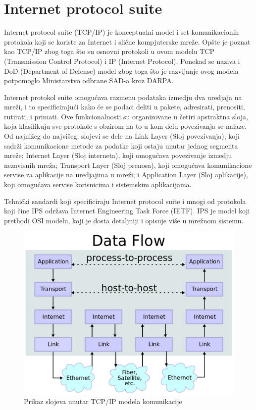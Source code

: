 \documentclass[a4paper,12pt, master]{etf}
\begin{document}
	\section{Internet protocol suite}

	Internet protocol suite (TCP/IP) je konceptualni model i set komunikacionih
	protokola koji se koriste za Internet i sli\v{c}ne kompjuterske mre\v{z}e.
	Op\v{s}te je poznat kao TCP/IP zbog toga \v{s}to su osnovni protokoli u
	ovom modelu TCP (Transmission Control Protocol) i IP (Internet Protocol).
	Ponekad se naziva i DoD (Department of Defense) model zbog toga \v{s}to je
	razvijanje ovog modela potpomoglo Ministarstvo odbrane SAD-a kroz DARPA.

	Internet protokol suite omogu\'{c}ava razmenu podataka izmedju dva uredjaja
    na mre\v{z}i, i to specificiraju\'{c}i kako \'{c}e se podaci deliti u
    pakete, adresirati, prenositi, rutirati, i primati. Ove funkcionalnosti su
    organizovane u \v{c}etiri apstraktna sloja, koja klasifikuju sve protokole
    s obzirom na to u kom delu povezivanja se nalaze. Od najni\v{z}eg do
    najvi\v{s}eg, slojevi se dele na Link Layer (Sloj povezivanja), koji
    sadr\v{z}i komunikacione metode za podatke koji ostaju unutar jednog
    segmenta mre\v{z}e; Internet Layer (Sloj interneta), koji omogu\'{c}ava
    povezivanje izmedju nezavisnih mre\v{z}a; Transport Layer (Sloj prenosa),
    koji omogu\'{c}ava komunikacione servise za aplikacije na uredjajima u
    mre\v{z}i; i Application Layer (Sloj aplikacije), koji omogu\'{c}ava
    servise korisnicima i sistemskim aplikacijama.

	Tehni\v{c}ki sandardi koji specificiraju Internet protocol suite i mnogi od
    protokola koji \v{c}ine IPS odr\v{z}ava Internet Engineering Task Force
    (IETF). IPS je model koji prethodi OSI modelu, koji je dosta detaljniji i
    opisuje vi\v{s}e u mre\v{z}nom sistemu.

	\begin{figure}[htb]
			\centering
			\includegraphics[scale=.5]{../pic/tcpip_model.png}
			\caption{Prikaz slojeva unutar TCP/IP modela komunikacije}
			\label{fig:tcpip_model}
	\end{figure}
\end{document}
